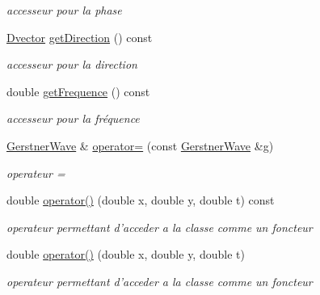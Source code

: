 \begin{DoxyCompactItemize}
\begin{DoxyCompactList}\small\item\em accesseur pour la phase \end{DoxyCompactList}\item 
\hypertarget{classGerstnerWave_a0da29133a4909347e29a5689aa0a8608}{\hyperlink{classDvector}{Dvector} \hyperlink{classGerstnerWave_a0da29133a4909347e29a5689aa0a8608}{get\-Direction} () const }\label{classGerstnerWave_a0da29133a4909347e29a5689aa0a8608}

\begin{DoxyCompactList}\small\item\em accesseur pour la direction \end{DoxyCompactList}\item 
\hypertarget{classGerstnerWave_aba276c45f82541ae705e887fcd713b8c}{double \hyperlink{classGerstnerWave_aba276c45f82541ae705e887fcd713b8c}{get\-Frequence} () const }\label{classGerstnerWave_aba276c45f82541ae705e887fcd713b8c}

\begin{DoxyCompactList}\small\item\em accesseur pour la fréquence \end{DoxyCompactList}\item 
\hyperlink{classGerstnerWave}{Gerstner\-Wave} \& \hyperlink{classGerstnerWave_a8580f5ccd3801c4d97ba89f8e55bf4bd}{operator=} (const \hyperlink{classGerstnerWave}{Gerstner\-Wave} \&g)
\begin{DoxyCompactList}\small\item\em operateur = \end{DoxyCompactList}\item 
double \hyperlink{classGerstnerWave_a19861f5ff98d978c98faeedfaabd1bec}{operator()} (double x, double y, double t) const 
\begin{DoxyCompactList}\small\item\em operateur permettant d'acceder a la classe comme un foncteur \end{DoxyCompactList}\item 
double \hyperlink{classGerstnerWave_a286b95dabb3280f03fa6c0c130bd22a3}{operator()} (double x, double y, double t)
\begin{DoxyCompactList}\small\item\em operateur permettant d'acceder a la classe comme un foncteur \end{DoxyCompactList}\end{DoxyCompactItemize}

